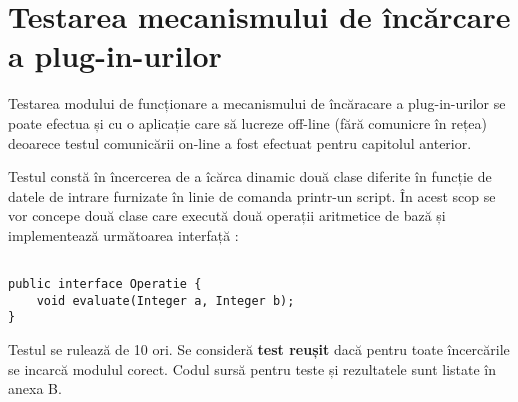 \section{Testarea mecanismului de încărcare a plug-in-urilor}
\par Testarea modului de funcționare a mecanismului de încăracare a plug-in-urilor se poate efectua și cu o aplicație care să lucreze off-line (fără comunicre în rețea) deoarece testul comunicării on-line a fost efectuat pentru capitolul anterior.
\par Testul constă în încercerea de a îcărca dinamic două clase diferite în funcție de datele de intrare furnizate în linie de comanda printr-un script. În acest scop se vor concepe două clase care execută două operații aritmetice de bază și implementează următoarea interfață :
\begin{verbatim}

public interface Operatie {
	void evaluate(Integer a, Integer b);
}

\end{verbatim}

\par Testul se rulează de 10 ori. Se consideră \textbf{test reușit} dacă pentru toate încercările se incarcă modulul corect. Codul sursă pentru teste și rezultatele sunt listate în anexa B.
